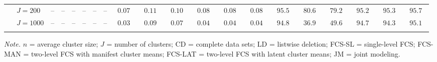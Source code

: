 \begin{sidewaystable}
\begin{threeparttable}
\begin{tabular}{llcccccccccccccccccc}
 & \nopagebreak $\;J=200$  & \phantom{00}--\phantom{00} & \phantom{00}--\phantom{00} & \phantom{00}--\phantom{00} & \phantom{00}--\phantom{00} & \phantom{00}--\phantom{00} & \phantom{00}--\phantom{00} & $\phantom{0}0.07\phantom{0}$ & $\phantom{0}0.11\phantom{0}$ & $\phantom{0}0.10\phantom{0}$ & $\phantom{0}0.08\phantom{0}$ & $\phantom{0}0.08\phantom{0}$ & $\phantom{0}0.08\phantom{0}$ & $\phantom{0}95.5\phantom{0}$ & $\phantom{0}80.6\phantom{0}$ & $\phantom{0}79.2\phantom{0}$ & $\phantom{0}95.2\phantom{0}$ & $\phantom{0}95.3\phantom{0}$ & $\phantom{0}95.7\phantom{0}$ \\
 & \nopagebreak $\;J=1000$  & \phantom{00}--\phantom{00} & \phantom{00}--\phantom{00} & \phantom{00}--\phantom{00} & \phantom{00}--\phantom{00} & \phantom{00}--\phantom{00} & \phantom{00}--\phantom{00} & $\phantom{0}0.03\phantom{0}$ & $\phantom{0}0.09\phantom{0}$ & $\phantom{0}0.07\phantom{0}$ & $\phantom{0}0.04\phantom{0}$ & $\phantom{0}0.04\phantom{0}$ & $\phantom{0}0.04\phantom{0}$ & $\phantom{0}94.8\phantom{0}$ & $\phantom{0}36.9\phantom{0}$ & $\phantom{0}49.6\phantom{0}$ & $\phantom{0}94.7\phantom{0}$ & $\phantom{0}94.3\phantom{0}$ & $\phantom{0}95.1\phantom{0}$ \\
[0.5ex]\hline\\[-1.6ex] 
\end{tabular}
\begin{tablenotes}{\footnotesize \textit{Note.} $n$ = average cluster size; $J$ = number of clusters; CD = complete data sets; LD = listwise deletion; FCS-SL = single-level FCS; FCS-MAN = two-level FCS with manifest cluster means; FCS-LAT = two-level FCS with latent cluster means; JM = joint modeling.}\end{tablenotes}
\end{threeparttable}
\end{sidewaystable}
